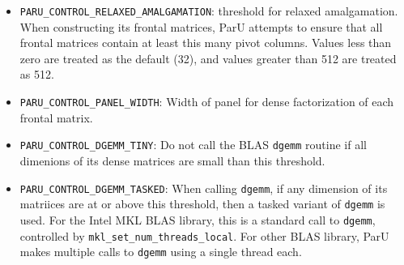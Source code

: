 \documentclass[12pt]{article}
\begin{document}
\begin{itemize}
        \begin{itemize}
        \item \verb'PARU_ORDERING_AMD':
            use AMD on $A+A'$ (symmetric strategy) or COLAMD (unsymmetric
            strategy), which orders $A'A$ without forming it explicitly.
        \item \verb'PARU_ORDERING_METIS': use METIS on $A+A'$ (symmetric
            strategy) or $A'A$ (unsymmetric strategy), where $A'A$ is
            explicitly formed.
        \item \verb'PARU_ORDERING_METIS_GUARD':
            use METIS, AMD, or COLAMD.  This is the default.
            Symmetric strategy: always use METIS on
            $A+A'$.  Unsymmetric strategy: use METIS on $A'A$, unless $A$ has
            one or more rows with $3.2\sqrt{n}$ or more entries.  In that case,
            $A'A$ is very costly to form, and COLAMD is used instead of METIS.
        \item \verb'PARU_ORDERING_CHOLMOD':
            use CHOLMOD (AMD/COLAMD then METIS, see above).
        \item \verb'PARU_ORDERING_BEST':
            try many orderings and pick the best one found.
        \item \verb'PARU_ORDERING_NONE':
            natural ordering.  The permutations $P$ and $Q$ are identity,
            unless singletons are removed prior to factorization.
        \end{itemize}

    \item \verb'PARU_CONTROL_RELAXED_AMALGAMATION': %
        threshold for relaxed amalgamation. When constructing its frontal
        matrices, ParU attempts to ensure that all frontal matrices contain at
        least this many pivot columns.  Values less than zero are treated as
        the default (32), and values greater than 512 are treated as 512.

    \item \verb'PARU_CONTROL_PANEL_WIDTH': %
        Width of panel for dense factorization of
        each frontal matrix.

    \item \verb'PARU_CONTROL_DGEMM_TINY': %
        Do not call the BLAS \verb'dgemm' routine if all dimenions of its dense
        matrices are small than this threshold.

    \item \verb'PARU_CONTROL_DGEMM_TASKED': %
        When calling \verb'dgemm', if any dimension of its matriices are at or
        above this threshold, then a tasked variant of \verb'dgemm' is used.
        For the Intel MKL BLAS library, this is a standard call to
        \verb'dgemm', controlled by \verb'mkl_set_num_threads_local'.  For
        other BLAS library, ParU makes multiple calls to \verb'dgemm' using a
        single thread each.


\end{itemize}
\end{document}
